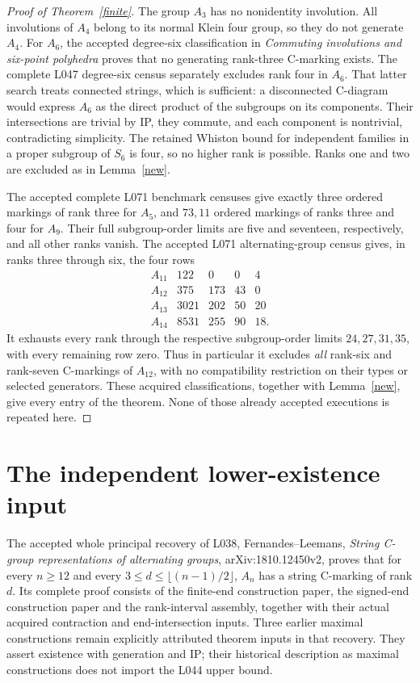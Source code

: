 \documentclass[11pt,a4paper]{article}
\begin{document}
\begin{proof}[Proof of Theorem~\ref{finite}]
The group $A_3$ has no nonidentity involution. All involutions
of $A_4$ belong to its normal Klein four group, so they do
not generate $A_4$. For $A_6$, the accepted degree-six
classification in \emph{Commuting involutions and six-point
polyhedra} proves that no generating rank-three C-marking
exists. The complete L047 degree-six census separately
excludes rank four in $A_6$. That latter search treats
connected strings, which is sufficient: a disconnected
C-diagram would express $A_6$ as the direct product of
the subgroups on its components. Their intersections are
trivial by IP, they commute, and each component is nontrivial,
contradicting simplicity. The retained Whiston bound for
independent families in a proper subgroup of $S_6$ is four,
so no higher rank is possible. Ranks one and two are excluded
as in Lemma~\ref{new}.

The accepted complete L071 benchmark censuses give exactly
three ordered markings of rank three for $A_5$, and
$73,11$ ordered markings of ranks three and four for $A_9$.
Their full subgroup-order limits are five and seventeen,
respectively, and all other ranks vanish. The accepted
L071 alternating-group census gives, in ranks three through
six, the four rows
\[
\begin{array}{c|rrrr}
A_{11}&122&0&0&4\\
A_{12}&375&173&43&0\\
A_{13}&3021&202&50&20\\
A_{14}&8531&255&90&18.
\end{array}
\]
It exhausts every rank through the respective subgroup-order
limits $24,27,31,35$, with every remaining row zero. Thus
in particular it excludes \emph{all} rank-six and rank-seven
C-markings of $A_{12}$, with no compatibility restriction
on their types or selected generators. These acquired
classifications, together with Lemma~\ref{new}, give every
entry of the theorem. None of those already accepted
executions is repeated here.
\end{proof}

\section*{The independent lower-existence input}
The accepted whole principal recovery of L038, Fernandes--Leemans,
\emph{String C-group representations of alternating groups},
arXiv:1810.12450v2, proves that for every $n\ge12$ and every
$3\le d\le\lfloor(n-1)/2\rfloor$, $A_n$ has a string
C-marking of rank $d$. Its complete proof consists of the
finite-end construction paper, the signed-end construction
paper and the rank-interval assembly, together with their
actual acquired contraction and end-intersection inputs.
Three earlier maximal constructions remain explicitly
attributed theorem inputs in that recovery. They assert
existence with generation and IP; their historical description
as maximal constructions does not import the L044 upper bound.
\end{document}
